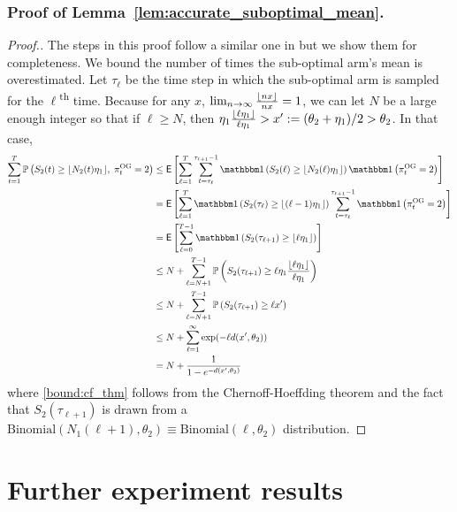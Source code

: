 \subsubsection{Proof of Lemma~\ref{lem:accurate_suboptimal_mean}.} \label{prf:proof_of_acc_sub_means}
\begin{proof}[Proof.]
	The steps in this proof follow a similar one in \cite{agrawal2013further} but we show them for completeness. We bound the number of times the sub-optimal arm's mean is overestimated. Let $\tau_\ell$ be the time step in which the  sub-optimal arm is sampled for the $\ell$\textsuperscript{th} time. Because for any $x$, $\lim_{n\to\infty}\frac{\lfloor nx\rfloor}{nx} = 1$, we can let $N$ be a large enough integer so that if $\ell \ge N$, then $\eta_1 \frac{\lfloor\ell \eta_1\rfloor}{\ell \eta_1} > x' := (\theta_2 + \eta_1)/2 > \theta_2$. In that case,
	\begin{align}
	\sum_{t=1}^T\P{S_2(t) \ge \floor{N_2(t) \eta_1}, \; \pi^{\rm OG}_t = 2} & \le \Ee{\sum_{\ell=1}^T \sum_{t=\tau_\ell}^{\tau_{\ell+1}-1}\ind{S_2(\ell) \ge \floor{N_2(\ell) \eta_1}} \ind{\pi^{\rm OG}_t = 2}} \nonumber \\
	& = \Ee{\sum_{\ell=1}^T \ind{S_2(\tau_{\ell}) \ge \floor{(\ell-1) \eta_1}} \sum_{t=\tau_\ell}^{\tau_{\ell+1}-1} \ind{\pi^{\rm OG}_t = 2}} \nonumber\\
	& = \Ee{\sum_{\ell=0}^{T-1} \ind{S_2(\tau_{\ell+1}) \ge \floor{\ell \eta_1}}} \nonumber\\
	& \le  N + \sum_{\ell=N+1}^{T-1} \P{ S_2(\tau_{\ell+1}) \ge \ell \eta_1 \frac{\floor{\ell \eta_1}}{\ell \eta_1}} \nonumber \\
	& \le N + \sum_{\ell=N+1}^{T-1} \P{ S_2(\tau_{\ell+1}) \ge \ell x'} \nonumber \\
	& \le  N + \sum_{\ell=1}^{\infty} \exp(-\ell d(x', \theta_2)) \label{bound:cf_thm} \\
	& = N + \frac{1}{1 - e^{-d(x',\theta_2)}} \nonumber
	\end{align}
	where \eqref{bound:cf_thm} follows from the Chernoff-Hoeffding theorem and the fact that $S_2(\tau_{\ell+1})$ is drawn from a $\text{Binomial}(N_1(\ell+1), \theta_2) \equiv \text{Binomial}(\ell, \theta_2)$ distribution.
\end{proof}

\section{Further experiment results} \label{sec:further_exp}
